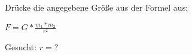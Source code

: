 
Drücke die angegebene Größe aus der Formel aus:

$F=G*\frac{m_{1}*m_{2}}{r^{2}}$

Gesucht: $r=\text{?}$